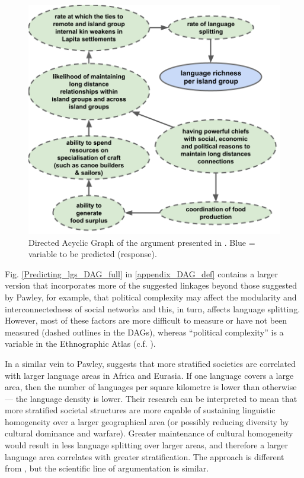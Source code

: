 \documentclass[12pt,letterpaper]{article}
\begin{document}
\begin{figure}[ht]
\centering
\includegraphics[width=\textwidth]{Predicting_lgs_DAG_andy.png}
\caption{Directed Acyclic Graph of the argument presented in \cite{pawley2007}. Blue = variable to be predicted (response).}
\label{Predicting_lgs_DAG_andy}
\end{figure}

Fig. \ref{Predicting_lgs_DAG_full} in \ref{appendix_DAG_def} contains a larger version that incorporates more of the suggested linkages beyond those suggested by Pawley, for example, that political complexity may affect the modularity and interconnectedness of social networks and this, in turn, affects language splitting. However, most of these factors are more difficult to measure or have not been measured (dashed outlines in the DAGs), whereas ``political complexity'' is a variable in the Ethnographic Atlas (c.f. \citet{gray1998ethnographic}).

In a similar vein to Pawley, \citet{curriemace2009} suggests that more stratified societies are correlated with larger language areas in Africa and Eurasia. If one language covers a large area, then the number of languages per square kilometre is lower than otherwise --- the language density is lower. Their research can be interpreted to mean that more stratified societal structures are more capable of sustaining linguistic homogeneity over a larger geographical area (or possibly reducing diversity by cultural dominance and warfare). Greater maintenance of cultural homogeneity would result in less language splitting over larger areas, and therefore a larger language area correlates with greater stratification. The approach is different from \citet{pawley81, pawley2007}, but the scientific line of argumentation is similar.
\end{document}
